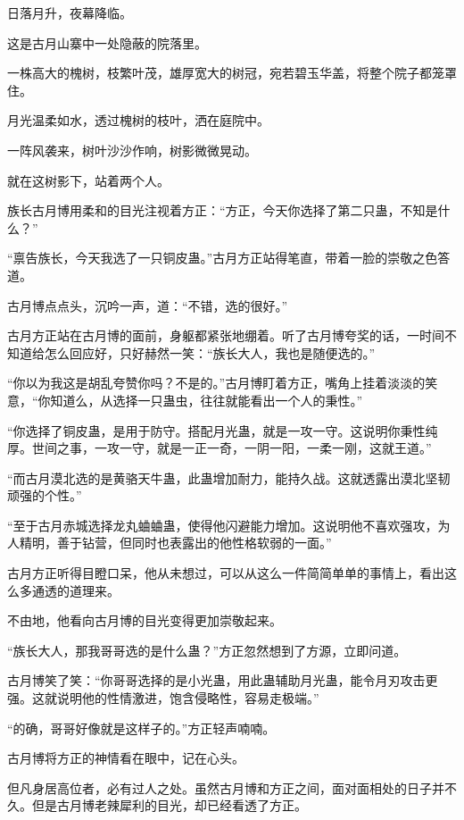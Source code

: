 
\begin{this_body}

日落月升，夜幕降临。

这是古月山寨中一处隐蔽的院落里。

一株高大的槐树，枝繁叶茂，雄厚宽大的树冠，宛若碧玉华盖，将整个院子都笼罩住。

月光温柔如水，透过槐树的枝叶，洒在庭院中。

一阵风袭来，树叶沙沙作响，树影微微晃动。

就在这树影下，站着两个人。

族长古月博用柔和的目光注视着方正：“方正，今天你选择了第二只蛊，不知是什么？”

“禀告族长，今天我选了一只铜皮蛊。”古月方正站得笔直，带着一脸的崇敬之色答道。

古月博点点头，沉吟一声，道：“不错，选的很好。”

古月方正站在古月博的面前，身躯都紧张地绷着。听了古月博夸奖的话，一时间不知道给怎么回应好，只好赫然一笑：“族长大人，我也是随便选的。”

“你以为我这是胡乱夸赞你吗？不是的。”古月博盯着方正，嘴角上挂着淡淡的笑意，“你知道么，从选择一只蛊虫，往往就能看出一个人的秉性。”

“你选择了铜皮蛊，是用于防守。搭配月光蛊，就是一攻一守。这说明你秉性纯厚。世间之事，一攻一守，就是一正一奇，一阴一阳，一柔一刚，这就王道。”

“而古月漠北选的是黄骆天牛蛊，此蛊增加耐力，能持久战。这就透露出漠北坚韧顽强的个性。”

“至于古月赤城选择龙丸蛐蛐蛊，使得他闪避能力增加。这说明他不喜欢强攻，为人精明，善于钻营，但同时也表露出的他性格软弱的一面。”

古月方正听得目瞪口呆，他从未想过，可以从这么一件简简单单的事情上，看出这么多通透的道理来。

不由地，他看向古月博的目光变得更加崇敬起来。

“族长大人，那我哥哥选的是什么蛊？”方正忽然想到了方源，立即问道。

古月博笑了笑：“你哥哥选择的是小光蛊，用此蛊辅助月光蛊，能令月刃攻击更强。这就说明他的性情激进，饱含侵略性，容易走极端。”

“的确，哥哥好像就是这样子的。”方正轻声喃喃。

古月博将方正的神情看在眼中，记在心头。

但凡身居高位者，必有过人之处。虽然古月博和方正之间，面对面相处的日子并不久。但是古月博老辣犀利的目光，却已经看透了方正。


\end{this_body}
